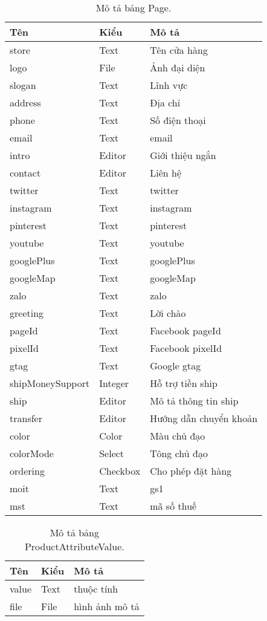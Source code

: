 \begin{table}[h!]
\begin{center}
	\caption{Mô tả bảng Page.}
	\begin{tabular}{ |l|l|l| } 
	\hline
	Tên & Kiểu & Mô tả \\
	\hline
	store & Text & Tên cửa hàng \\
logo & File & Ảnh đại diện \\
slogan & Text & Lĩnh vực \\
address & Text & Địa chỉ \\
phone & Text & Số điện thoại \\
email & Text & email \\
intro & Editor & Giới thiệu ngắn \\
contact & Editor & Liên hệ \\
twitter & Text & twitter \\
instagram & Text & instagram \\
pinterest & Text & pinterest \\
youtube & Text & youtube \\
googlePlus & Text & googlePlus \\
googleMap & Text & googleMap \\
zalo & Text & zalo \\
greeting & Text & Lời chào \\
pageId & Text & Facebook pageId \\
pixelId & Text & Facebook pixelId \\
gtag & Text & Google gtag \\
shipMoneySupport & Integer & Hỗ trợ tiền ship \\
ship & Editor & Mô tả thông tin ship \\
transfer & Editor & Hướng dẫn chuyển khoản \\
color & Color & Màu chủ đạo \\
colorMode & Select & Tông chủ đạo \\
ordering & Checkbox & Cho phép đặt hàng \\
moit & Text & gs1 \\
mst & Text & mã số thuế \\


	\hline
\end{tabular}
	\label{table:Page}
\end{center}
\end{table}


\begin{table}[h!]
\begin{center}
	\caption{Mô tả bảng ProductAttributeValue.}
	\begin{tabular}{ |l|l|l| } 
	\hline
	Tên & Kiểu & Mô tả \\
	\hline
	value & Text & thuộc tính \\
file & File & hình ảnh mô tả \\ 
	\hline
\end{tabular}
	\label{table:ProductAttributeValue}
\end{center}
\end{table}


